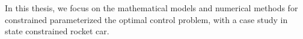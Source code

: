 
In this thesis, we focus on the mathematical models and numerical methods for constrained parameterized  the optimal control problem, with a case study in state constrained rocket car.

